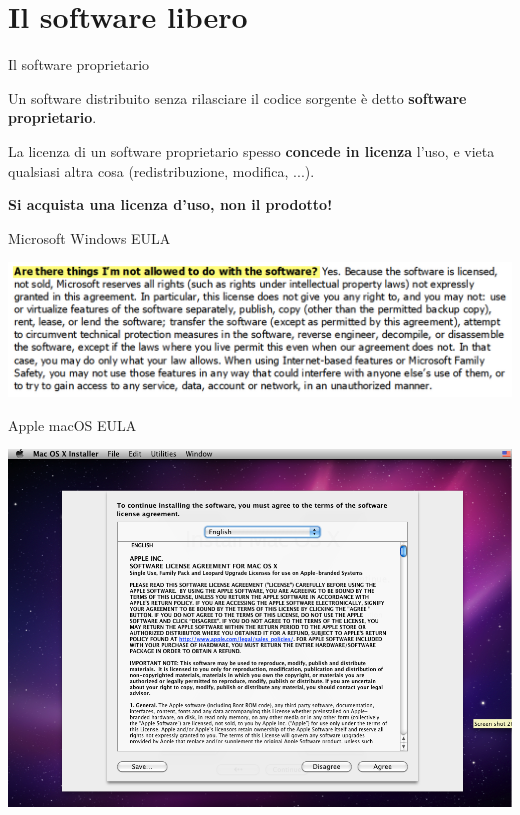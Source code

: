 \documentclass[10pt]{beamer}
\begin{document}
\section{Il software libero}

\begin{frame}[fragile]{Il software proprietario}

Un software distribuito senza rilasciare il codice sorgente è detto \textbf{software proprietario}.

La licenza di un software proprietario spesso \textbf{concede in licenza} l'uso, e vieta qualsiasi altra cosa (redistribuzione, modifica, ...).

\textbf{Si acquista una licenza d'uso, non il prodotto!}

\end{frame}

\begin{frame}[fragile]{Microsoft Windows EULA}

\centering \includegraphics[scale=0.15]{windows_eula}

\end{frame}

\begin{frame}[fragile]{Apple macOS EULA}

\centering \includegraphics[scale=0.4]{apple_macos_eula}

\end{frame}
\end{document}
